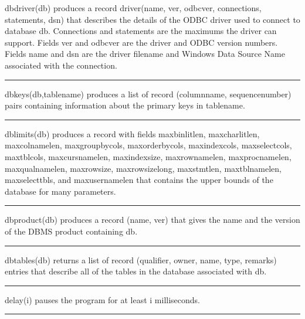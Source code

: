 \noindent
{}dbdriver(db) produces a record driver(name, ver,
odbcver, connections, statements, dsn) that describes the details of
the ODBC driver used to connect to database db. Connections
and statements are the maximums the driver can support. Fields
\textsf{ver} and \textsf{odbcver} are the driver and ODBC version
numbers. Fields \textsf{name} and \textsf{dsn} are the driver filename
and Windows Data Source Name associated with the connection.

\bigskip\hrule\vspace{0.1cm}

\noindent
{}dbkeys(db,tablename) produces a list of record
(columnname, sequencenumber) pairs containing information about the
primary keys in tablename.

\bigskip\hrule\vspace{0.1cm}

\noindent
dblimits(db) produces a record with fields \textsf{maxbinlitlen,
maxcharlitlen, maxcolnamelen, maxgroupbycols, maxorderbycols,
maxindexcols, maxselectcols, maxtblcols, maxcursnamelen, maxindexsize,
maxrownamelen, maxprocnamelen, maxqualnamelen, maxrowsize,
maxrowsizelong, maxstmtlen, maxtblnamelen, maxselecttbls,} and\textsf{
maxusernamelen} that contains the upper bounds of the database for many
parameters.

\bigskip\hrule\vspace{0.1cm}

\noindent
dbproduct(db) produces a record (name, ver) that gives the name and the
version of the DBMS product containing db.

\bigskip\hrule\vspace{0.1cm}

\noindent
dbtables(db) returns a list of record (qualifier, owner, name, type,
remarks) entries that describe all of the tables in the database
associated with db.

\bigskip\hrule\vspace{0.1cm}

\noindent
{}delay(i) pauses the program for at least i milliseconds.

\bigskip\hrule\vspace{0.1cm}

